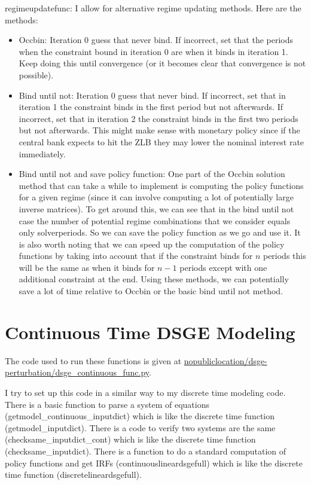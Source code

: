 \documentclass{article}
\theoremstyle{definition}
\begin{document}
regimeupdatefunc: I allow for alternative regime updating methods. Here are the methods:
\begin{itemize}
    \item Occbin: Iteration 0 guess that never bind. If incorrect, set that the periods when the constraint bound in iteration 0 are when it binds in iteration 1. Keep doing this until convergence (or it becomes clear that convergence is not possible).
    \item Bind until not: Iteration 0 guess that never bind. If incorrect, set that in iteration 1 the constraint binds in the first period but not afterwards. If incorrect, set that in iteration 2 the constraint binds in the first two periods but not afterwards. This might make sense with monetary policy since if the central bank expects to hit the ZLB they may lower the nominal interest rate immediately.
    \item Bind until not and save policy function: One part of the Occbin solution method that can take a while to implement is computing the policy functions for a given regime (since it can involve computing a lot of potentially large inverse matrices). To get around this, we can see that in the bind until not case the number of potential regime combinations that we consider equals only solverperiods. So we can save the policy function as we go and use it. It is also worth noting that we can speed up the computation of the policy functions by taking into account that if the constraint binds for $n$ periods this will be the same as when it binds for $n - 1$ periods except with one additional constraint at the end. Using these methods, we can potentially save a lot of time relative to Occbin or the basic bind until not method.
\end{itemize}

\section{Continuous Time DSGE Modeling}
The code used to run these functions is given at \url{nopubliclocation/dsge-perturbation/dsge_continuous_func.py}.

I try to set up this code in a similar way to my discrete time modeling code. There is a basic function to parse a system of equations (getmodel\_continuous\_inputdict) which is like the discrete time function (getmodel\_inputdict). There is a code to verify two systems are the same (checksame\_inputdict\_cont) which is like the discrete time function (checksame\_inputdict). There is a function to do a standard computation of policy functions and get IRFs (continuouslineardsgefull) which is like the discrete time function (discretelineardsgefull).
\end{document}
